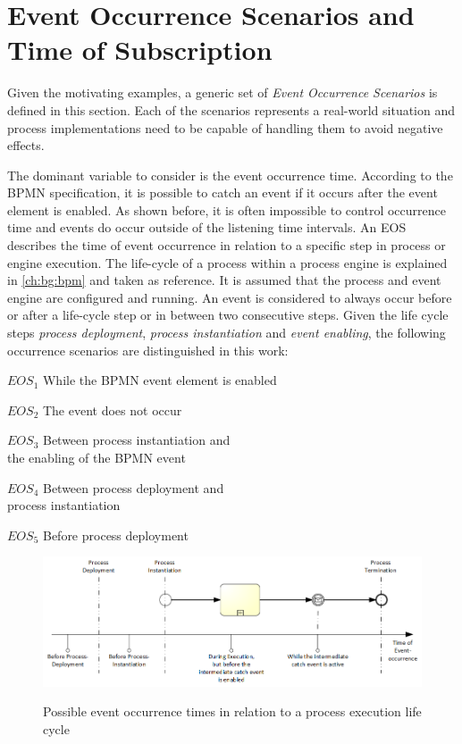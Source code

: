 \section{Event Occurrence Scenarios and Time of Subscription}\label{ch:ps:eos}
Given the motivating examples, a generic set of \textit{Event Occurrence Scenarios} is defined in this section. 
Each of the scenarios represents a real-world situation and process implementations need to be capable of handling them to avoid negative effects.

\medskip \noindent
The dominant variable to consider is the event occurrence time.
According to the BPMN specification, it is possible to catch an event if it occurs after the event element is enabled. As shown before, it is often impossible to control occurrence time and events do occur outside of the listening time intervals.
An \ac{EOS} describes the time of event occurrence in relation to a specific step in process or engine execution.
The life-cycle of a process within a process engine is explained in \autoref{ch:bg:bpm} and taken as reference. It is assumed that the process and event engine are configured and running.
An event is considered to always occur before or after a life-cycle step or in between two consecutive steps. 
Given the life cycle steps \textit{process deployment}, \textit{process instantiation} and \textit{event enabling}, the following occurrence scenarios are distinguished in this work:

\begin{aenumerate}
	\item[$EOS_{1}$] While the BPMN event element is enabled
	\item[$EOS_{2}$] The event does not occur
	\item[$EOS_{3}$] Between process instantiation and \\the enabling of the BPMN event
	\item[$EOS_{4}$] Between process deployment and \\process instantiation
	\item[$EOS_{5}$] Before process deployment
\end{aenumerate}\label{def:occurrence-times}

\begin{figure}[]
	\myfloatalign
	{\includegraphics[width=1\linewidth]{chapters/requirements/timeline-event-occurrence.png}}
	\caption{Possible event occurrence times in relation to a process execution life cycle}
	\label{fig:occurrence-timeline}
\end{figure}

